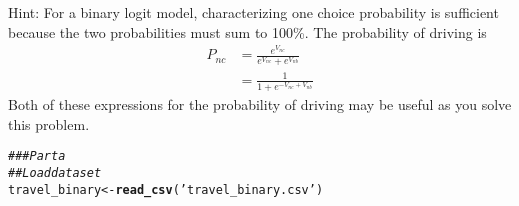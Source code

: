 \documentclass[11pt,letterpaper]{article}\usepackage[]{graphicx}\usepackage[]{color}
\makeatletter
\newcommand{\hlstr}[1]{\textcolor[rgb]{0.192,0.494,0.8}{#1}}%
\newcommand{\hlcom}[1]{\textcolor[rgb]{0.678,0.584,0.686}{\textit{#1}}}%
\newcommand{\hlstd}[1]{\textcolor[rgb]{0.345,0.345,0.345}{#1}}%
\newcommand{\hlkwb}[1]{\textcolor[rgb]{0.69,0.353,0.396}{#1}}%
\newcommand{\hlkwd}[1]{\textcolor[rgb]{0.737,0.353,0.396}{\textbf{#1}}}%
\newenvironment{kframe}{%
 \def\at@end@of@kframe{}%
 \ifinner\ifhmode%
  \def\at@end@of@kframe{\end{minipage}}%
  \begin{minipage}{\columnwidth}%
 \fi\fi%
 \def\FrameCommand##1{\hskip\@totalleftmargin \hskip-\fboxsep
 \colorbox{shadecolor}{##1}\hskip-\fboxsep
     \hskip-\linewidth \hskip-\@totalleftmargin \hskip\columnwidth}%
 \MakeFramed {\advance\hsize-\width
   \@totalleftmargin\z@ \linewidth\hsize
   \@setminipage}}%
 {\par\unskip\endMakeFramed%
 \at@end@of@kframe}
\newenvironment{knitrout}{}{} %
\makeatother
\begin{document}
\begin{enumerate}[label=\alph*., leftmargin=*]
	Hint: For a binary logit model, characterizing one choice probability is sufficient because the two probabilities must sum to 100\%. The probability of driving is
	\begin{align*}
		P_{nc} &= \frac{e^{V_{nc}}}{e^{V_{nc}} + e^{V_{nb}}} \\
		&= \frac{1}{1 + e^{-V_{nc} + V_{nb}}}
	\end{align*}
	Both of these expressions for the probability of driving may be useful as you solve this problem.

\begin{knitrout}
\color{fgcolor}\begin{kframe}
\begin{alltt}
\hlcom{### Part a}
\hlcom{## Load dataset}
\hlstd{travel_binary} \hlkwb{<-} \hlkwd{read_csv}\hlstd{(}\hlstr{'travel_binary.csv'}\hlstd{)}
\end{alltt}



\end{kframe}
\end{knitrout}
\end{enumerate}
\end{document}
